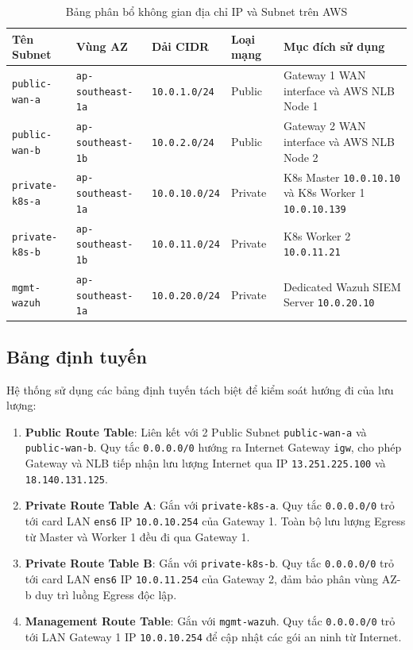 \begin{table}[H]
    \centering
    \small
    \renewcommand{\arraystretch}{1.25}
    \caption{Bảng phân bổ không gian địa chỉ IP và Subnet trên AWS}
    \label{tab:subnets}
    \begin{tabularx}{\textwidth}{l l l l X}
        \toprule
        \textbf{Tên Subnet} & \textbf{Vùng AZ} & \textbf{Dải CIDR} & \textbf{Loại mạng} & \textbf{Mục đích sử dụng} \\
        \midrule
        \texttt{public-wan-a} & \texttt{ap-southeast-1a} & \texttt{10.0.1.0/24} & Public & Gateway 1 WAN interface và AWS NLB Node 1 \\
        \texttt{public-wan-b} & \texttt{ap-southeast-1b} & \texttt{10.0.2.0/24} & Public & Gateway 2 WAN interface và AWS NLB Node 2 \\
        \texttt{private-k8s-a} & \texttt{ap-southeast-1a} & \texttt{10.0.10.0/24} & Private & K8s Master \texttt{10.0.10.10} và K8s Worker 1 \texttt{10.0.10.139} \\
        \texttt{private-k8s-b} & \texttt{ap-southeast-1b} & \texttt{10.0.11.0/24} & Private & K8s Worker 2 \texttt{10.0.11.21} \\
        \texttt{mgmt-wazuh} & \texttt{ap-southeast-1a} & \texttt{10.0.20.0/24} & Private & Dedicated Wazuh SIEM Server \texttt{10.0.20.10} \\
        \bottomrule
    \end{tabularx}
\end{table}

\subsection{Bảng định tuyến}
Hệ thống sử dụng các bảng định tuyến tách biệt để kiểm soát hướng đi của lưu lượng:
\begin{enumerate}
    \item \textbf{Public Route Table}: Liên kết với 2 Public Subnet \texttt{public-wan-a} và \texttt{public-wan-b}. Quy tắc \texttt{0.0.0.0/0} hướng ra Internet Gateway \texttt{igw}, cho phép Gateway và NLB tiếp nhận lưu lượng Internet qua IP  \texttt{13.251.225.100} và \texttt{18.140.131.125}.
    \item \textbf{Private Route Table A}: Gắn với \texttt{private-k8s-a}. Quy tắc \texttt{0.0.0.0/0} trỏ tới card LAN \texttt{ens6} IP \texttt{10.0.10.254} của Gateway 1. Toàn bộ lưu lượng Egress từ Master và Worker 1 đều đi qua Gateway 1.
    \item \textbf{Private Route Table B}: Gắn với \texttt{private-k8s-b}. Quy tắc \texttt{0.0.0.0/0} trỏ tới card LAN \texttt{ens6} IP \texttt{10.0.11.254} của Gateway 2, đảm bảo phân vùng AZ-b duy trì luồng Egress độc lập.
    \item \textbf{Management Route Table}: Gắn với \texttt{mgmt-wazuh}. Quy tắc \texttt{0.0.0.0/0} trỏ tới LAN Gateway 1 IP \texttt{10.0.10.254} để cập nhật các gói an ninh từ Internet.
\end{enumerate}

